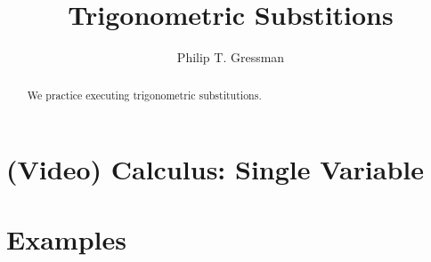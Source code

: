 \documentclass{ximera}
\title{Trigonometric Substitions}
\author{Philip T. Gressman}
\begin{document}
\begin{abstract}
  We practice executing trigonometric substitutions.
\end{abstract}
\maketitle

\section*{(Video) Calculus: Single Variable}

\section*{Examples}

\begin{example}

\end{example}

\begin{example}

\end{example}
\end{document}
